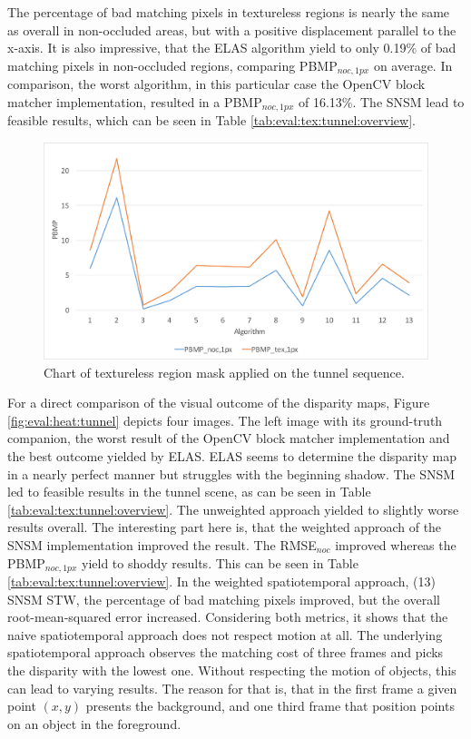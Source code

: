 \noindent The percentage of bad matching pixels in textureless regions is nearly the same as overall in non-occluded areas, but with a positive displacement parallel to the x-axis.
It is also impressive, that the ELAS algorithm yield to only 0.19\% of bad matching pixels in non-occluded regions, comparing PBMP$_{noc,1px}$ on average.
In comparison, the worst algorithm, in this particular case the OpenCV block matcher implementation, resulted in a PBMP$_{noc,1px}$ of 16.13\%.
The SNSM lead to feasible results, which can be seen in Table \ref{tab:eval:tex:tunnel:overview}.

\begin{figure}[h!]
\centering
\includegraphics[width=1.0\textwidth]{src/images/evaluation/plots/05-tunnel-pbmp-tex-1.pdf}
\caption[Chart of textureless region mask]{Chart of textureless region mask applied on the tunnel sequence.}
\label{fig:eval-plots-pbmp-tex1}
\end{figure}

\noindent For a direct comparison of the visual outcome of the disparity maps, Figure \ref{fig:eval:heat:tunnel} depicts four images.
The left image with its ground-truth companion, the worst result of the OpenCV block matcher implementation and the best outcome yielded by ELAS.
ELAS seems to determine the disparity map in a nearly perfect manner but struggles with the beginning shadow.
\newline\newline\noindent The SNSM led to feasible results in the tunnel scene, as can be seen in Table \ref{tab:eval:tex:tunnel:overview}.
The unweighted approach yielded to slightly worse results overall.
The interesting part here is, that the weighted approach of the SNSM implementation improved the result.
The RMSE$_{noc}$ improved whereas the PBMP$_{noc,1px}$ yield to shoddy results.
This can be seen in Table \ref{tab:eval:tex:tunnel:overview}.
In the weighted spatiotemporal approach, (13) SNSM STW, the percentage of bad matching pixels improved, but the overall root-mean-squared error increased.
Considering both metrics, it shows that the naive spatiotemporal approach does not respect motion at all.
The underlying spatiotemporal approach observes the matching cost of three frames and picks the disparity with the lowest one.
Without respecting the motion of objects, this can lead to varying results.
The reason for that is, that in the first frame a given point $(x,y)$ presents the background, and one third frame that position points on an object in the foreground.


